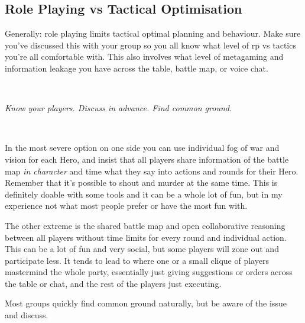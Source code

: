 \subsection*{Role Playing vs Tactical Optimisation}
Generally: role playing limits tactical optimal planning and behaviour. Make sure you've discussed this with your group so you all know what level of rp vs tactics you're all comfortable with. This also involves what level of metagaming and information leakage you have across the table, battle map, or voice chat.

\

\noindent \emph{Know your players. Discuss in advance. Find common ground.}

\

In the most severe option on one side you can use individual fog of war and vision for each Hero, and insist that all players share information of the battle map \emph{in character} and time what they say into actions and rounds for their Hero. Remember that it's possible to shout and murder at the same time. This is definitely doable with some tools and it can be a whole lot of fun, but in my experience not what most people prefer or have the most fun with.

The other extreme is the shared battle map and open collaborative reasoning between all players without time limits for every round and individual action. This can be a lot of fun and very social, but some players will zone out and participate less. It tends to lead to where one or a small clique of players mastermind the whole party, essentially just giving suggestions or orders across the table or chat, and the rest of the players just executing.

Most groups quickly find common ground naturally, but be aware of the issue and discuss.










